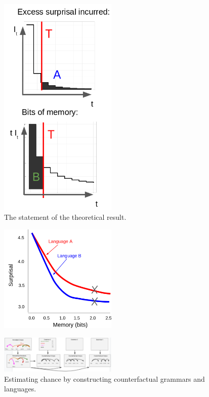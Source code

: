 \documentclass[11pt,letterpaper]{article}
\newcounter{theorem}
\begin{document}
\begin{figure}
\includegraphics[width=0.5\textwidth]{figures-gdrive/theorem.png}
	\caption{The statement of the theoretical result.}\label{fig:results}
\end{figure}




\begin{figure}
\includegraphics[width=0.5\textwidth]{figures-gdrive/tradeoff.png}
	\caption{}\label{fig:results}
\end{figure}



\begin{figure}
\includegraphics[width=0.5\textwidth]{figures-gdrive/counterfactual-languages.png}
	\caption{Estimating chance by constructing counterfactual grammars and languages.}\label{fig:results}
\end{figure}
\end{document}
